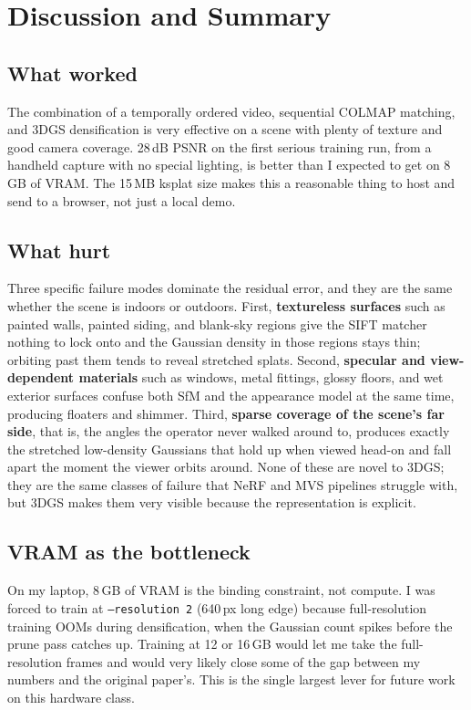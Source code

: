 \documentclass[conference]{IEEEtran}
\begin{document}
\section{Discussion and Summary}\label{sec:discussion}

\subsection{What worked}

The combination of a temporally ordered video, sequential COLMAP matching, and 3DGS densification is very effective on a scene with plenty of texture and good camera coverage. 28\,dB PSNR on the first serious training run, from a handheld capture with no special lighting, is better than I expected to get on 8\,GB of VRAM. The 15\,MB ksplat size makes this a reasonable thing to host and send to a browser, not just a local demo.

\subsection{What hurt}

Three specific failure modes dominate the residual error, and they are the same whether the scene is indoors or outdoors. First, \textbf{textureless surfaces} such as painted walls, painted siding, and blank-sky regions give the SIFT matcher nothing to lock onto and the Gaussian density in those regions stays thin; orbiting past them tends to reveal stretched splats. Second, \textbf{specular and view-dependent materials} such as windows, metal fittings, glossy floors, and wet exterior surfaces confuse both SfM and the appearance model at the same time, producing floaters and shimmer. Third, \textbf{sparse coverage of the scene's far side}, that is, the angles the operator never walked around to, produces exactly the stretched low-density Gaussians that hold up when viewed head-on and fall apart the moment the viewer orbits around. None of these are novel to 3DGS; they are the same classes of failure that NeRF and MVS pipelines struggle with, but 3DGS makes them very visible because the representation is explicit.

\subsection{VRAM as the bottleneck}

On my laptop, 8\,GB of VRAM is the binding constraint, not compute. I was forced to train at \texttt{--resolution 2} (640\,px long edge) because full-resolution training OOMs during densification, when the Gaussian count spikes before the prune pass catches up. Training at 12 or 16\,GB would let me take the full-resolution frames and would very likely close some of the gap between my numbers and the original paper's. This is the single largest lever for future work on this hardware class.
\end{document}
